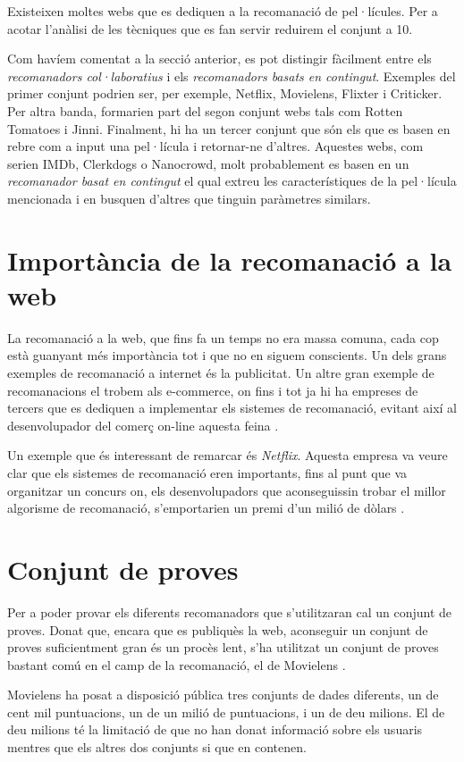 Existeixen moltes webs que es dediquen a la recomanació de pel·lícules. Per a acotar l'anàlisi de les tècniques que es fan servir reduirem el conjunt a 10.\cite{top-ten-film-recommenders}

Com havíem comentat a la secció anterior, es pot distingir fàcilment entre els \emph{recomanadors col·laboratius} i els \emph{recomanadors basats en contingut}. Exemples del primer conjunt podrien ser, per exemple, Netflix, Movielens, Flixter i Criticker. Per altra banda, formarien part del segon conjunt webs tals com Rotten Tomatoes i Jinni. Finalment, hi ha un tercer conjunt que són els que es basen en rebre com a input una pel·lícula i retornar-ne d'altres. Aquestes webs, com serien IMDb, Clerkdogs o Nanocrowd, molt probablement es basen en un \emph{recomanador basat en contingut} el qual extreu les característiques de la pel·lícula mencionada i en busquen d'altres que tinguin paràmetres similars.

\section{Importància de la recomanació a la web}

La recomanació a la web, que fins fa un temps no era massa comuna, cada cop està guanyant més importància tot i que no en siguem conscients. Un dels grans exemples de recomanació a internet és la publicitat. Un altre gran exemple de recomanacions el trobem als e-commerce, on fins i tot ja hi ha empreses de tercers que es dediquen a implementar els sistemes de recomanació, evitant així al desenvolupador del comerç on-line aquesta feina \cite{brainsins}.

Un exemple que és interessant de remarcar és \emph{Netflix}. Aquesta empresa va veure clar que els sistemes de recomanació eren importants, fins al punt que va organitzar un concurs on, els desenvolupadors que aconseguissin trobar el millor algorisme de recomanació, s'emportarien un premi d'un milió de dòlars \cite{netflix-prize}.

\section{Conjunt de proves}

Per a poder provar els diferents recomanadors que s'utilitzaran cal un conjunt de proves. Donat que, encara que es publiquès la web, aconseguir un conjunt de proves suficientment gran és un procès lent, s'ha utilitzat un conjunt de proves bastant comú en el camp de la recomanació, el de Movielens \cite{movielens-dataset}.

Movielens ha posat a disposició pública tres conjunts de dades diferents, un de cent mil puntuacions, un de un milió de puntuacions, i un de deu milions. El de deu milions té la limitació de que no han donat informació sobre els usuaris mentres que els altres dos conjunts si que en contenen.